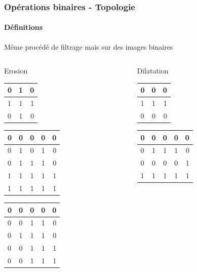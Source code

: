 \documentclass[french]{beamer}
\begin{document}
\begin{frame}
	\frametitle{Opérations binaires - Topologie}
	\framesubtitle{Définitions}
	Même procédé de filtrage mais sur des images binaires
	\begin{columns}[T]
		\begin{column}{3cm}
			Erosion \\
			\bigskip
			\begin{tabular}{|l|c|r|}
				\hline
				0 & 1 & 0 \\ \hline
				1 & 1 & 1 \\ \hline
				0 & 1 & 0 \\
				\hline
			\end{tabular}
			\begin{tabular}{|l|c|c|c|r|}
				\hline
				0 & 0 & 0 & 0 & 0 \\ \hline
				0 & 1 & 0 & 1 & 0 \\ \hline
				0 & 1 & 1 & 1 & 0 \\ \hline
				1 & 1 & 1 & 1 & 1 \\ \hline
				1 & 1 & 1 & 1 & 1 \\
				\hline
			\end{tabular}
			\begin{tabular}{|l|c|c|c|r|}
				\hline
				0 & 0 & 0 & 0 & 0 \\ \hline
				0 & 0 & 1 & 1 & 0 \\ \hline
				0 & 1 & 1 & 1 & 0 \\ \hline
				0 & 0 & 1 & 1 & 1 \\ \hline
				0 & 0 & 1 & 1 & 1 \\
				\hline
			\end{tabular}
		\end{column}
		\begin{column}{3cm}
			Dilatation \\
			\bigskip
			\begin{tabular}{|l|c|r|}
				\hline
				0 & 0 & 0 \\ \hline
				1 & 1 & 1 \\ \hline
				0 & 0 & 0 \\
				\hline
			\end{tabular}
			\begin{tabular}{|l|c|c|c|r|}
				\hline
				0 & 0 & 0 & 0 & 0 \\ \hline
				0 & 1 & 1 & 1 & 0 \\ \hline
				0 & 0 & 0 & 0 & 1 \\ \hline
				1 & 1 & 1 & 1 & 1 \\ \hline

\end{tabular}
\end{column}
\end{columns}
\end{frame}
\end{document}
